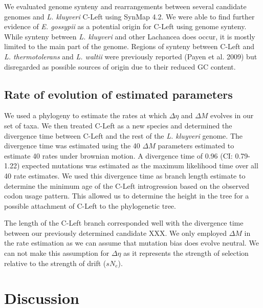 \documentclass[12pt]{article}
\begin{document}
We evaluated genome synteny and rearrangements between several candidate genomes and \textit{L. kluyveri} C-Left using SynMap 4.2.
We were able to find further evidence of \textit{E. gossypii} as a potential origin for C-Left using genome synteny.
While synteny between \textit{L. kluyveri} and other Lachancea does occur, it is mostly limited to the main part of the genome.
Regions of synteny between C-Left and \textit{L. thermotolerans} and \textit{L. waltii} were previously reported (Payen et al. 2009) but disregarded as possible sources of origin due to their reduced GC content.

\subsection*{Rate of evolution of estimated parameters}
We used a phylogeny to estimate the rates at which $\Delta \eta$ and $\Delta M$ evolves in our set of taxa. 
We then treated C-Left as a new species and determined the divergence time between C-Left and the rest of the \textit{L. kluyveri} genome.
The divergence time was estimated using the 40 $\Delta M$ parameters estimated to estimate 40 rates under brownian motion. 
A divergence time of 0.96 (CI: 0.79-1.22) expected mutations was estimated as the maximum likelihood time over all 40 rate estimates.
We used this divergence time as branch length estimate to determine the minimum age of the C-Left introgression based on the observed codon usage pattern.
This allowed us to determine the height in the tree for a possible attachment of C-Left to the phylogenetic tree.

The length of the C-Left branch corresponded well with the divergence time between our previously determined candidate XXX. 
We only employed $\Delta M$ in the rate estimation as we can assume that mutation bias does evolve neutral.
We can not make this assumption for $\Delta \eta$ as it represents the strength of selection relative to the strength of drift ($sN_e$).

\section*{Discussion}
\end{document}
